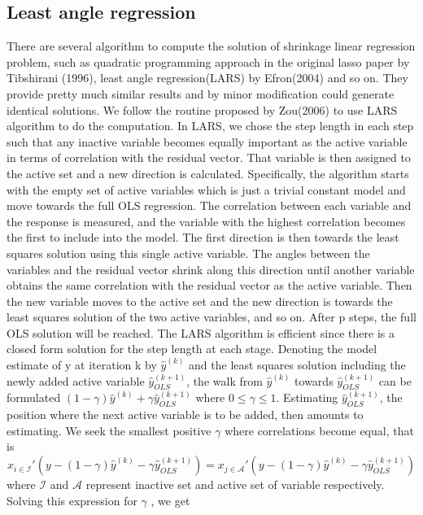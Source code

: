 \documentclass[titlepage,11pt]{article}
\begin{document}
\subsection{Least angle regression}
There are several algorithm to compute the solution of shrinkage linear regression problem, such as quadratic programming approach in the original lasso paper by Tibshirani (1996), least angle regression(LARS) by Efron(2004) and so on. They provide pretty much similar results and by minor modification could generate identical solutions. We follow the routine proposed by Zou(2006) to use LARS algorithm to do the computation.
In LARS, we chose the step length in each step such that any inactive variable becomes equally important as the active variable in terms of correlation with the residual vector. That variable is then assigned to the active set and a new direction is calculated. Specifically, the algorithm starts with the empty set of active variables which is just a trivial constant model and move towards the full OLS regression. The correlation between each variable and the response is measured, and the variable with the highest correlation becomes the first to include into the model. The first direction is then towards the least squares solution using this single active variable. The angles between the variables and the residual vector shrink along this direction until another variable obtains the same correlation with the residual vector as the active variable. Then the new variable moves to the active set and the new direction is towards the least squares solution of the two active variables, and so on. After p steps, the full OLS solution will be reached.
The LARS algorithm is efficient since there is a closed form solution for the step length at each
stage. Denoting the model estimate of y at iteration k by $\hat{y}^{(k)}$ and the least squares solution
including the newly added active variable $\hat{y}^{(k+1)}_{OLS}$, the walk from $\hat{y}^{(k)}$ towards $\hat{y}^{(k+1)}_{OLS}$ can be formulated $ (1-\gamma)\hat{y}^{(k)} + \gamma\hat{y}^{(k+1)}_{OLS}$ where $0 \leq \gamma \leq 1$. Estimating $\hat{y}^{(k+1)}_{OLS}$, the position where the next active variable is to be added, then amounts to estimating. We seek the smallest positive $\gamma$ where correlations become equal, that is
\begin{equation*}
x_{i\in \mathcal{I}}'(y-(1-\gamma)\hat{y}^{(k)} - \gamma \hat{y}^{(k+1)}_{OLS}) = x_{j \in \mathcal{A}}'(y-(1-\gamma)\hat{y}^{(k)} - \gamma \hat{y}^{(k+1)}_{OLS})
\end{equation*}
where $\mathcal{I}$ and $\mathcal{A}$ represent inactive set and active set of variable respectively.
Solving this expression for $\gamma$ , we get
\end{document}
